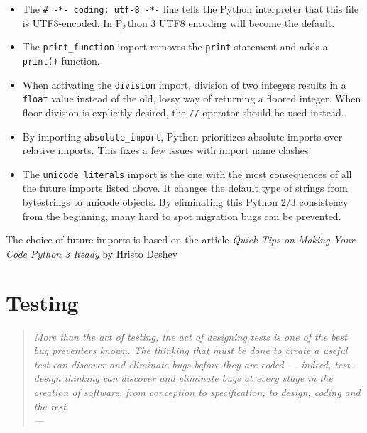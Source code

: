 \begin{itemize}
	\item The \texttt{\# -*- coding: utf-8 -*-} line tells the Python interpreter
		that this file is UTF8-encoded. In Python 3 UTF8 encoding will become the
		default.
	\item The \texttt{print\_function} import removes the \texttt{print} statement
		and adds a \texttt{print()} function.
	\item When activating the \texttt{division} import, division of two integers
		results in a \texttt{float} value instead of the old, lossy way of returning
		a floored integer. When floor division is explicitly desired, the
		\texttt{//} operator should be used instead.
	\item By importing \texttt{absolute\_import}, Python prioritizes absolute
		imports over relative imports. This fixes a few issues with import name
		clashes.
	\item The \texttt{unicode\_literals} import is the one with the most
		consequences of all the future imports listed above. It changes the default
		type of strings from bytestrings to unicode objects. By eliminating this
		Python 2/3 consistency from the beginning, many hard to spot migration bugs
		can be prevented.
\end{itemize}

\noindent The choice of future imports is based on the article \emph{Quick Tips
on Making Your Code Python 3 Ready} by Hristo Deshev \cite{deshev:2012}


\section{Testing}

\begin{quote}{\slshape
More than the act of testing, the act of designing tests is one of the best bug
preventers known. The thinking that must be done to create a useful test can
discover and eliminate bugs before they are coded — indeed, test-design thinking
can discover and eliminate bugs at every stage in the creation of software, from
conception to specification, to design, coding and the rest.\\ \medskip
---  \citep{beizer:2003}
}\end{quote}

